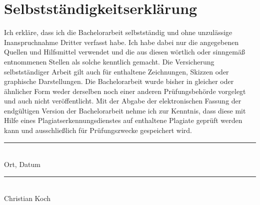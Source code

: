\clearpage
\thispagestyle{empty}
\section*{Selbstständigkeitserklärung}

\noindent
Ich erkläre, dass ich die Bachelorarbeit selbstständig und ohne unzulässige Inanspruchnahme Dritter verfasst habe.
Ich habe dabei nur die angegebenen Quellen und Hilfsmittel verwendet und die aus diesen wörtlich oder sinngemäß entnommenen Stellen als solche kenntlich gemacht.
Die Versicherung selbstständiger Arbeit gilt auch für enthaltene Zeichnungen, Skizzen oder graphische Darstellungen.
Die Bachelorarbeit wurde bisher in gleicher oder ähnlicher Form weder derselben noch einer anderen Prüfungsbehörde vorgelegt und auch nicht veröffentlicht.
Mit der Abgabe der elektronischen Fassung der endgültigen Version der Bachelorarbeit nehme ich zur Kenntnis, dass diese mit Hilfe eines Plagiatserkennungsdienstes auf enthaltene Plagiate geprüft werden kann und ausschließlich für Prüfungszwecke gespeichert wird.

\vspace{2cm}

\noindent
\begin{minipage}[t]{0.42\textwidth}
    \rule{\linewidth}{0.4pt}\\[0.5em]
    Ort, Datum
\end{minipage}
\hfill
\begin{minipage}[t]{0.48\textwidth}
    \rule{\linewidth}{0.4pt}\\[0.5em]
    Christian Koch
\end{minipage}
